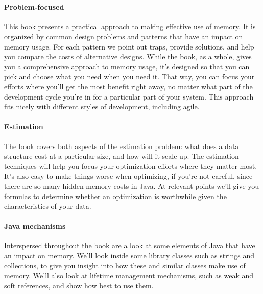 \section{\thetitle}
\paragraph{Problem-focused}This book presents a practical approach to making
effective use of memory.
It is organized by
common design problems and patterns that have an impact on memory usage. For each pattern we point out
traps, provide solutions, and help you compare the costs of alternative
designs.
While the book, as a whole, gives you a
comprehensive approach to memory usage, it's designed so that you can pick and choose what you need when you need it.
That way, you can focus your efforts where you'll get the most benefit right away, no matter what
part of the development cycle you're in for a particular part of your system.
This approach fits nicely with different styles of development, including agile.

\paragraph{Estimation}The book covers both aspects of the estimation problem:
what does a data structure cost at a particular size, and how will it scale up. The
estimation techniques will help you focus your optimization efforts where they matter most.
It's also easy to make things worse when
optimizing, if you're not careful, since there are so many hidden memory costs
in Java. At relevant points we'll give you formulas to
determine whether an optimization is worthwhile given the characteristics of your data.

\paragraph{Java mechanisms}Interspersed throughout the book are a look at some
elements of Java that have an impact on memory. We'll look inside some library
classes such as strings and collections, to give you insight into how these and
similar classes make use of memory.
We'll also look at lifetime management mechanisms, such as weak and soft references,
and show how best to use them.

